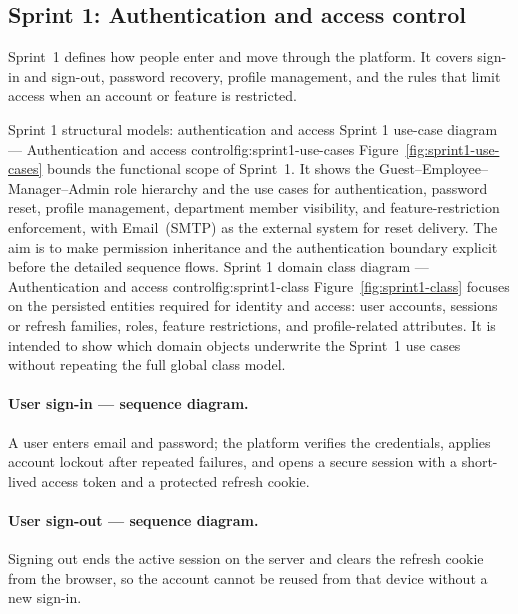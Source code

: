 \subsection{Sprint 1: Authentication and access control}\label{subsec:sprint1-design}

Sprint~1 defines how people enter and move through the platform. It covers
sign-in and sign-out, password recovery, profile management, and the rules that
limit access when an account or feature is restricted.

%
  {Sprint 1 structural models: authentication and access}%
  {Sprint 1 use-case diagram — Authentication and access control}{fig:sprint1-use-cases}%
  {Figure~\ref{fig:sprint1-use-cases} bounds the functional scope of Sprint~1.
  It shows the Guest--Employee--Manager--Admin role hierarchy and the use cases
  for authentication, password reset, profile management, department member
  visibility, and feature-restriction enforcement, with Email~(SMTP) as the
  external system for reset delivery. The aim is to make permission inheritance
  and the authentication boundary explicit before the detailed sequence flows.}%
  {Sprint 1 domain class diagram — Authentication and access control}{fig:sprint1-class}%
  {Figure~\ref{fig:sprint1-class} focuses on the persisted entities required for
  identity and access: user accounts, sessions or refresh families, roles,
  feature restrictions, and profile-related attributes. It is intended to show
  which domain objects underwrite the Sprint~1 use cases without repeating the
  full global class model.}%



\paragraph{User sign-in --- sequence diagram.}
A user enters email and password; the platform verifies the credentials, applies
account lockout after repeated failures, and opens a secure session with a
short-lived access token and a protected refresh cookie.

\paragraph{User sign-out --- sequence diagram.}
Signing out ends the active session on the server and clears the refresh cookie
from the browser, so the account cannot be reused from that device without a new
sign-in.

